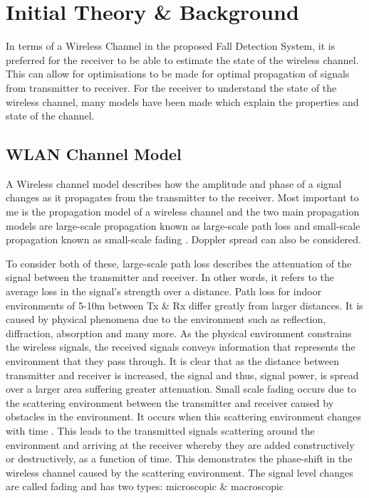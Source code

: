 \section{Initial Theory \& Background}
In terms of a Wireless Channel in the proposed Fall Detection System, it is preferred for the receiver to be able to estimate the state of the wireless channel. This can allow for optimisations to be made for optimal propagation of signals from transmitter to receiver. For the receiver to understand the state of the wireless channel, many models have been made which explain the properties and state of the channel.
\subsection{WLAN Channel Model}
A Wireless channel model describes how the amplitude and phase of a signal changes as it propagates from the transmitter to the receiver. Most important to me is the propagation model of a wireless channel and the two main propagation models are large-scale propagation known as large-scale path loss and small-scale propagation known as small-scale fading \citep{articleWLAN}. Doppler spread can also be considered. \par
To consider both of these, large-scale path loss describes the attenuation of the signal between the transmitter and receiver. In other words, it refers to the average loss in the signal's strength over a distance. Path loss for indoor environments of 5-10m between Tx \& Rx differ greatly from larger distances. It is caused by physical phenomena due to the environment such as reflection, diffraction, absorption and many more. As the physical environment constrains the wireless signals, the received signals conveys information that represents the environment that they pass through. It is clear that as the distance between transmitter and receiver is increased, the signal and thus, signal power, is spread over a larger area suffering greater attenuation. Small scale fading occurs due to the scattering environment between the transmitter and receiver caused by obstacles in the environment. It occurs when this scattering environment changes with time \citep{articleWLAN}. This leads to the transmitted signals scattering around the environment and arriving at the receiver whereby they are added constructively or destructively, as a function of time. This demonstrates the phase-shift in the wireless channel caused by the scattering environment. The signal level changes are called fading and has two types: microscopic \& macroscopic \citep{channelModels}\par
